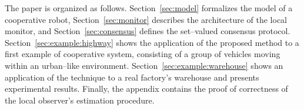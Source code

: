 \documentclass[journal, onecolumn, 12pt]{styles/IEEEtran}
\begin{document}
%

The paper is organized as follows. Section~\ref{sec:model} formalizes the model of a cooperative robot, Section~\ref{sec:monitor} describes the architecture of the local monitor, and Section~\ref{sec:consensus} defines the set--valued consensus protocol. Section~\ref{sec:example:highway} shows the application of the proposed method to a first example of cooperative system, consisting of a group of vehicles moving within an urban--like environment. Section~\ref{sec:example:warehouse} shows an application of the technique to a real factory's warehouse and presents experimental results. Finally, the appendix contains the proof of correctness of the local observer's estimation procedure. 
\end{document}
